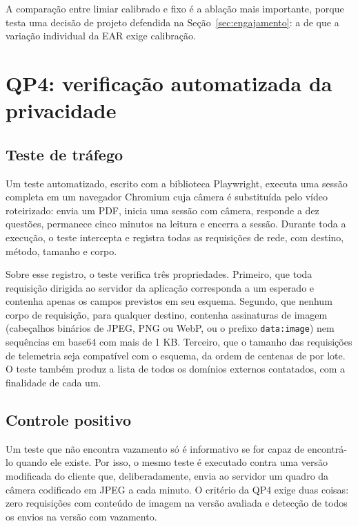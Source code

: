 A comparação entre limiar calibrado e fixo é a ablação mais importante, porque testa uma decisão de projeto defendida na Seção~\ref{sec:engajamento}: a de que a variação individual da EAR exige calibração.

\section{\label{sec:met-qp4}QP4: verificação automatizada da privacidade}

\subsection{Teste de tráfego}

Um teste automatizado, escrito com a biblioteca Playwright, executa uma sessão completa em um navegador Chromium cuja câmera é substituída pelo vídeo roteirizado: envia um PDF, inicia uma sessão com câmera, responde a dez questões, permanece cinco minutos na leitura e encerra a sessão. Durante toda a execução, o teste intercepta e registra todas as requisições de rede, com destino, método, tamanho e corpo.

Sobre esse registro, o teste verifica três propriedades. Primeiro, que toda requisição dirigida ao servidor da aplicação corresponda a um  esperado e contenha apenas os campos previstos em seu esquema. Segundo, que nenhum corpo de requisição, para qualquer destino, contenha assinaturas de imagem (cabeçalhos binários de JPEG, PNG ou WebP, ou o prefixo \texttt{data:image}) nem sequências em base64 com mais de 1 KB. Terceiro, que o tamanho das requisições de telemetria seja compatível com o esquema, da ordem de centenas de  por lote. O teste também produz a lista de todos os domínios externos contatados, com a finalidade de cada um.

\subsection{Controle positivo}

Um teste que não encontra vazamento só é informativo se for capaz de encontrá-lo quando ele existe. Por isso, o mesmo teste é executado contra uma versão modificada do cliente que, deliberadamente, envia ao servidor um quadro da câmera codificado em JPEG a cada minuto. O critério da QP4 exige duas coisas: zero requisições com conteúdo de imagem na versão avaliada e detecção de todos os envios na versão com vazamento.

